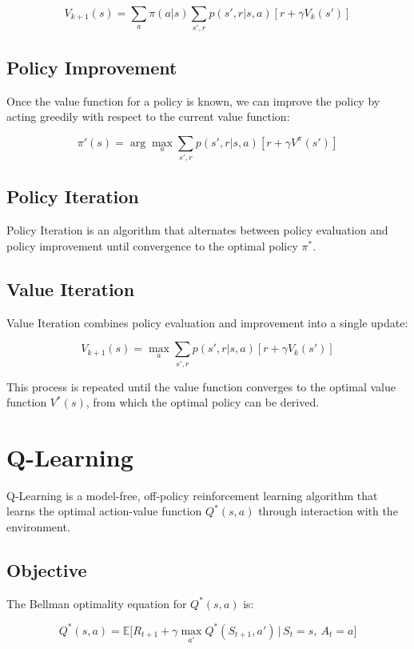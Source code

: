 \documentclass[10pt,twocolumn,letterpaper]{article}
\begin{document}
\[
V_{k+1}(s) = \sum_{a} \pi(a|s) \sum_{s', r} p(s', r | s, a) \left[ r + \gamma V_k(s') \right]
\]

\subsection*{Policy Improvement}
Once the value function for a policy is known, we can improve the policy by acting greedily with respect to the current value function:

\[
\pi'(s) = \arg\max_a \sum_{s', r} p(s', r | s, a) \left[ r + \gamma V^\pi(s') \right]
\]

\subsection*{Policy Iteration}
Policy Iteration is an algorithm that alternates between policy evaluation and policy improvement until convergence to the optimal policy $\pi^*$.

\subsection*{Value Iteration}
Value Iteration combines policy evaluation and improvement into a single update:

\[
V_{k+1}(s) = \max_a \sum_{s', r} p(s', r | s, a) \left[ r + \gamma V_k(s') \right]
\]

This process is repeated until the value function converges to the optimal value function $V^*(s)$, from which the optimal policy can be derived.

\section{Q-Learning}

Q-Learning is a model-free, off-policy reinforcement learning algorithm that learns the optimal action-value function \( Q^*(s, a) \) through interaction with the environment.

\subsection*{Objective}

The Bellman optimality equation for \( Q^*(s, a) \) is:

\begin{adjustwidth}{-0.5cm}{0cm}
$$
Q^*(s, a) = \mathbb{E} \big[ R_{t+1} + \gamma \max_{a'} Q^*(S_{t+1}, a') \,\big|\, S_t = s,\ A_t = a \big]
$$
\end{adjustwidth}
\end{document}
